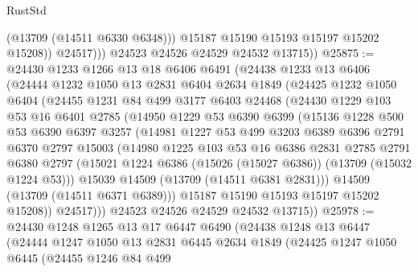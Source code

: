 \begin{lexlean}{RustStd}
\begin{coremodule}
                    (@13709 (@14511 @6330 @6348)))
                  @15187
                  @15190
                  @15193
                  @15197
                  @15202
                  @15208))
              @24517)))
        @24523
        @24526
        @24529
        @24532
        @13715))
@25875 := @24430
    @1233
    @1266
    @13
    @18
    @6406
    @6491
    (@24438
      @1233
      @13
      @6406
      (@24444
        @1232
        @1050
        @13
        @2831
        @6404
        @2634
        @1849
        (@24425
          @1232
          @1050
          @6404
          (@24455
            @1231
            @84
            @499
            @3177
            @6403
            @24468
            (@24430
              @1229
              @103
              @53
              @16
              @6401
              @2785
              (@14950
                @1229
                @53
                @6390
                @6399
                (@15136
                  @1228
                  @500
                  @53
                  @6390
                  @6397
                  @3257
                  (@14981
                    @1227
                    @53
                    @499
                    @3203
                    @6389
                    @6396
                    @2791
                    @6370
                    @2797
                    @15003
                    (@14980
                      @1225
                      @103
                      @53
                      @16
                      @6386
                      @2831
                      @2785
                      @2791
                      @6380
                      @2797
                      (@15021 @1224 @6386 (@15026 (@15027 @6386)) (@13709 (@15032 @1224 @53)))
                      @15039
                      @14509
                      (@13709 (@14511 @6381 @2831)))
                    @14509
                    (@13709 (@14511 @6371 @6389)))
                  @15187
                  @15190
                  @15193
                  @15197
                  @15202
                  @15208))
              @24517)))
        @24523
        @24526
        @24529
        @24532
        @13715))
@25978 := @24430
    @1248
    @1265
    @13
    @17
    @6447
    @6490
    (@24438
      @1248
      @13
      @6447
      (@24444
        @1247
        @1050
        @13
        @2831
        @6445
        @2634
        @1849
        (@24425
          @1247
          @1050
          @6445
          (@24455
            @1246
            @84
            @499

\end{coremodule}
\end{lexlean}

